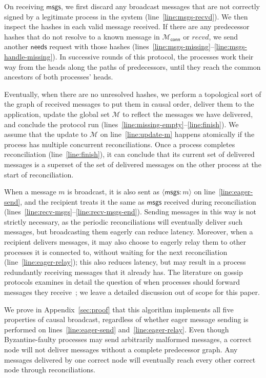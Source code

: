 \documentclass[a4paper,anonymous,USenglish]{lipics-v2019}
\begin{document}
On receiving $\mathsf{msgs}$, we first discard any broadcast messages that are not correctly signed by a legitimate process in the system (line~\ref{line:msgs-recvd}).
We then inspect the hashes in each valid message received.
If there are any predecessor hashes that do not resolve to a known message in $\mathcal{M}_\mathsf{conn}$ or $\mathit{recvd}$, we send another $\mathsf{needs}$ request with those hashes (lines~\ref{line:msgs-missing}--\ref{line:msgs-handle-missing}).
In successive rounds of this protocol, the processes work their way from the heads along the paths of predecessors, until they reach the common ancestors of both processes' heads.

Eventually, when there are no unresolved hashes, we perform a topological sort of the graph of received messages to put them in causal order, deliver them to the application, update the global set $\mathcal{M}$ to reflect the messages we have delivered, and conclude the protocol run (lines~\ref{line:missing-empty}--\ref{line:finish}).
We assume that the update to $\mathcal{M}$ on line~\ref{line:update-m} happens atomically if the process has multiple concurrent reconciliations.
Once a process completes reconciliation (line~\ref{line:finish}), it can conclude that its current set of delivered messages is a superset of the set of delivered messages on the other process at the start of reconciliation.

When a message $m$ is broadcast, it is also sent as $\langle\mathsf{msgs}: m\rangle$ on line~\ref{line:eager-send}, and the recipient treats it the same as $\mathsf{msgs}$ received during reconciliation (lines~\ref{line:recv-msgs}--\ref{line:recv-msgs-end}).
Sending messages in this way is not strictly necessary, as the periodic reconciliations will eventually deliver such messages, but broadcasting them eagerly can reduce latency.
Moreover, when a recipient delivers messages, it may also choose to eagerly relay them to other processes it is connected to, without waiting for the next reconciliation (line~\ref{line:eager-relay}); this also reduces latency, but may result in a process redundantly receiving messages that it already has.
The literature on gossip protocols examines in detail the question of when processes should forward messages they receive~\cite{Leitao:2009fi}; we leave a detailed discussion out of scope for this paper.

We prove in Appendix~\ref{sec:proof} that this algorithm implements all five properties of causal broadcast, regardless of whether eager message sending is performed on lines~\ref{line:eager-send} and~\ref{line:eager-relay}.
Even though Byzantine-faulty processes may send arbitrarily malformed messages, a correct node will not deliver messages without a complete predecessor graph.
Any messages delivered by one correct node will eventually reach every other correct node through reconciliations.
\end{document}
